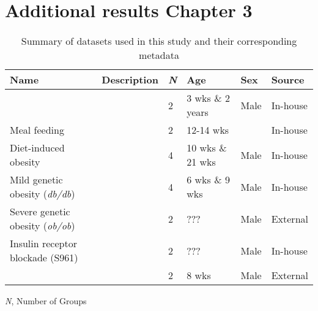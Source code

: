 \clearpage


\section{Additional results Chapter 3}

\begin{table}[h]
\renewcommand{\arraystretch}{2}
  \centering
  \caption{Summary of datasets used in this study and their corresponding metadata}
  \label{tab3-1}

  \begin{tabularx}{\textwidth}{W{2.5cm} X W{1cm} W{1.7cm} W{1.5cm} W{1.3cm}}
    \toprule
    \textbf{Name} & \textbf{Description} & \textbf{\textit{N}} & \textbf{Age} & \textbf{Sex} & \textbf{Source} \\
    \midrule
     &  & 2 & 3 wks \& 2 years & Male & In-house \\
    \hline
    Meal feeding &  & 2 & 12-14 wks &  & In-house \\
    \hline
    Diet-induced obesity &  & 4 & 10 wks \& 21 wks & Male & In-house \\
    \hline
    Mild genetic obesity (\textit{db/db}) &  & 4 & 6 wks \& 9 wks & Male & In-house \\
    \hline
    Severe genetic obesity (\textit{ob/ob}) &  & 2 & ??? & Male & External \textbf{\cite{chung_endocrine-exocrine_2020}} \\
    \hline
    Insulin receptor blockade (S961) &  & 2 & ??? & Male & In-house \\
    \hline
     &  & 2 & 8 wks & Male & External \textbf{\cite{sachs_targeted_2020}} \\
    \bottomrule
   
  \end{tabularx}
\end{table}
\textit{N}, Number of Groups

